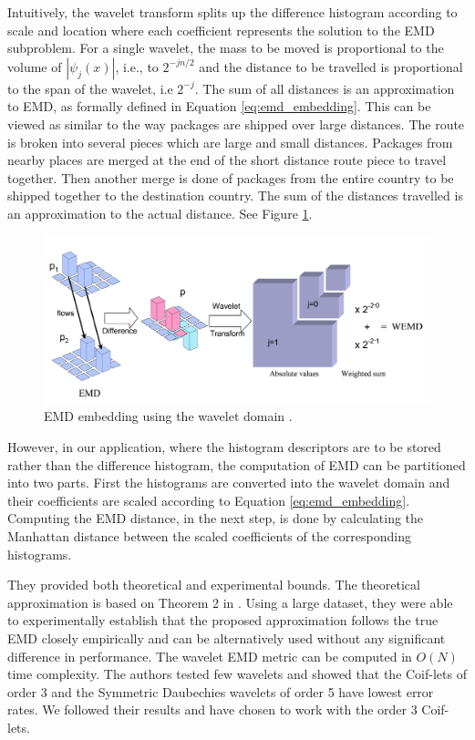 \documentclass[10pt, conference, compsocconf]{IEEEtran}
\theoremstyle{definition}
\begin{document}
Intuitively, the wavelet transform splits up the difference histogram according to scale and location where each coefficient represents the solution to the EMD subproblem. 
For a single wavelet, the mass to be moved is proportional to the volume of $|\psi_j(x)|$, i.e., to $2^{-jn/2}$ and the distance to be travelled is proportional to the span of the wavelet, i.e $2^{-j}$. The sum of all distances is an approximation to EMD, as formally defined in Equation \ref{eq:emd_embedding}. 
This can be viewed as similar to the way packages are shipped over large distances. 
The route is broken into several pieces which are large and small distances. 
Packages from nearby places are merged at the end of the short distance route piece to travel together. 
Then another merge is done of packages from the entire country to be shipped together to the destination country. 
The sum of the distances travelled is an approximation to the actual distance. See Figure \ref{fig:emd_wavelet}.

\begin{figure}
\centering
\includegraphics[width=1\columnwidth]{./figures/emd_wavelet}       
\caption{EMD embedding using the wavelet domain \cite{shirdhonkar2008approximate}.}
\label{fig:emd_wavelet} 
\end{figure}

However, in our application, where the histogram descriptors are to be stored rather than the difference histogram, the computation of EMD can be partitioned into two parts. 
First the histograms are converted into the wavelet domain and their coefficients are scaled according to Equation \ref{eq:emd_embedding}. 
Computing the EMD distance, in the next step, is done by calculating the Manhattan distance between the scaled coefficients of the corresponding histograms.

They provided both theoretical and experimental bounds. 
The theoretical approximation is based on Theorem 2 in \cite{shirdhonkar2008approximate}. 
Using a large dataset, they were able to experimentally establish that the proposed approximation follows the true EMD closely empirically and can be alternatively used without any significant difference in performance. 
The wavelet EMD metric can be computed in $O\left( N \right)$ time complexity. 
The authors tested few wavelets and showed that the Coif-lets of order 3 and the Symmetric Daubechies wavelets of order 5 have lowest error rates. 
We followed their results and have chosen to work with the order 3 Coif-lets.
\end{document}
